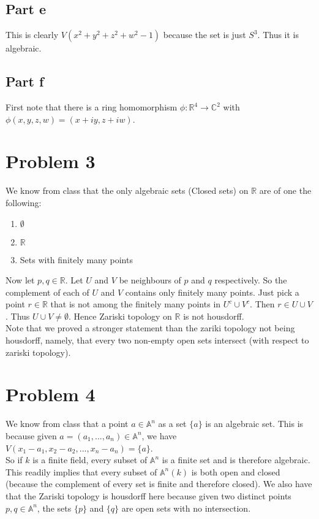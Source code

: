 \documentclass[12pt]{article}
\begin{document}
\subsection*{Part e}
This is clearly $V(x^2+y^2+z^2+w^2-1)$ because the set is just $S^3$. Thus it is algebraic.
\subsection*{Part f}
First note that there is a ring homomorphism $ \phi: \mathbb{R}^4 \rightarrow \mathbb{C}^2$ with
$\phi(x,y,z,w)=(x+iy,z+iw)$. 

\section*{Problem 3}
We know from class that the only algebraic sets (Closed sets) on $\mathbb{R}$ are of one the following:
\begin{enumerate}
\item $\emptyset $
\item $\mathbb{R}$
\item Sets with finitely many points
\end{enumerate}
Now let $p,q \in \mathbb{R}$. 
Let $U$ and $V$ be neighbours of $p$ and $q$ respectively. So the complement of each of $U$ and $V$ contains only finitely many points. Just pick a point $r \in \mathbb{R}$ that is not among the finitely many points in $U^{c} \cup V^{c}$. Then $r \in U \cup V$.
Thus $U \cup V \not= \emptyset$.
Hence Zariski topology on $\mathbb{R}$ is not housdorff.
\\
Note that we proved a stronger statement than the zariki topology not being housdorff, namely, that every two non-empty open sets intersect (with respect to zariski topology).

\section*{Problem 4}
We know from class that a point $a \in \mathbb{A}^n$ as a set $\{a\}$ is an algebraic set. This is because given 
$a=(a_1,...,a_n) \in \mathbb{A}^n$, we have 
$V(x_1-a_1,x_2-a_2,...,x_n-a_n)=\{a\}$.
\\
So if $k$ is a finite field, every subset of $\mathbb{A}^n$ is a finite set and is therefore algebraic. This readily implies that every subset of $\mathbb{A}^n(k)$ is both open and closed (because the complement of every set is finite and therefore closed). We also have that the Zariski topology is housdorff here because given two distinct points $p,q \in \mathbb{A}^n$, the sets $\{p\}$ and $\{q\}$ are open sets with no intersection.
\end{document}
